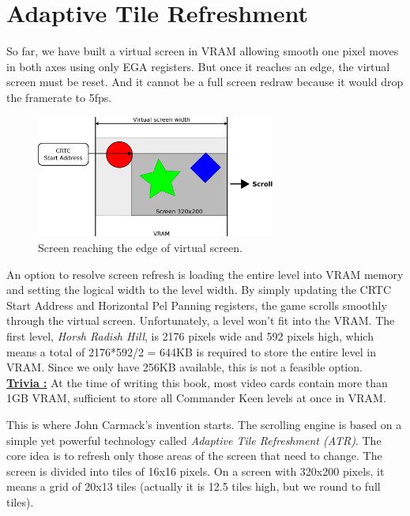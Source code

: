 \documentclass[book.tex]{subfiles}
\begin{document}
\section{Adaptive Tile Refreshment}
So far, we have built a virtual screen in VRAM allowing smooth one pixel moves in both axes using only EGA registers. But once it reaches an edge, the virtual screen must be reset. And it cannot be a full screen redraw because it would drop the framerate to 5fps.\\


\begin{figure}[H]
\centering
\includegraphics[width=0.7\textwidth]{imgs/drawings/screen_edge.eps}
\caption{Screen reaching the edge of virtual screen.}
\label{fig:screen_edge}
\end{figure}

\par
An option to resolve screen refresh is loading the entire level into VRAM memory and setting the logical width to the level width. By simply updating the CRTC Start Address and Horizontal Pel Panning registers, the game scrolls smoothly through the virtual screen. Unfortunately, a level won't fit into the VRAM. The first level, \textit{Horsh Radish Hill}, is 2176 pixels wide and 592 pixels high, which means a total of 2176*592/2 = 644KB is required to store the entire level in VRAM. Since we only have 256KB available, this is not a feasible option. \\


\textbf{\underline{Trivia :}} At the time of writing this book, most video cards contain more than 1GB VRAM, sufficient to store all Commander Keen levels at once in VRAM. \\

\par
This is where John Carmack's invention starts. The scrolling engine is based on a simple yet powerful technology called \textit{Adaptive Tile Refreshment (ATR)}. The core idea is to refresh only those areas of the screen that need to change. The screen is divided into tiles of 16x16 pixels. On a screen with 320x200 pixels, it means a grid of 20x13 tiles (actually it is 12.5 tiles high, but we round to full tiles). \\
\end{document}
